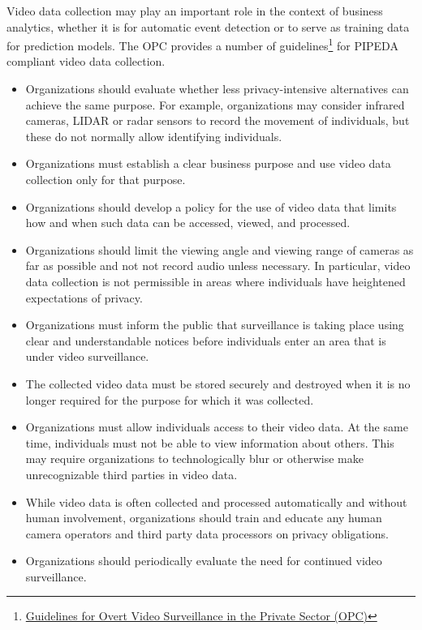 Video data collection may play an important role in the context of business analytics, whether it is for automatic event detection or to serve as training data for prediction models. The OPC provides a number of guidelines\footnote{\href{https://www.priv.gc.ca/en/privacy-topics/surveillance/video-surveillance-by-businesses/gl_vs_080306/}{Guidelines for Overt Video Surveillance in the Private Sector (OPC)}} for PIPEDA compliant video data collection. 

\begin{itemize}
   \item Organizations should evaluate whether less privacy-intensive alternatives can achieve the same purpose. For example, organizations may consider infrared cameras, LIDAR or radar sensors to record the movement of individuals, but these do not normally allow identifying individuals.
   \item Organizations must establish a clear business purpose and use video data collection only for that purpose.
   \item Organizations should develop a policy for the use of video data that limits how and when such data can be accessed, viewed, and processed.
   \item Organizations should limit the viewing angle and viewing range of cameras as far as possible and not not record audio unless necessary. In particular, video data collection is not permissible in areas where individuals have heightened expectations of privacy.
   \item Organizations must inform the public that surveillance is taking place using clear and understandable notices before individuals enter an area that is under video surveillance.
   \item The collected video data must be stored securely and destroyed when it is no longer required for the purpose for which it was collected.
   \item Organizations must allow individuals access to their video data. At the same time, individuals must not be able to view information about others. This may require organizations to technologically blur or otherwise make unrecognizable third parties in video data.
   \item While video data is often collected and processed automatically and without human involvement, organizations should train and educate any human camera operators and third party data processors on privacy obligations. 
   \item Organizations should periodically evaluate the need for continued video surveillance.
\end{itemize}

